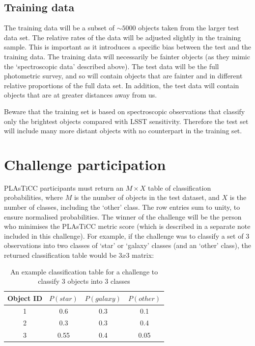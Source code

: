 \documentclass[\docopts]{\docclass}
\begin{document}
\subsection{Training data}
The training data will be a subset of $\sim 5000$ objects taken from the larger test data set. The relative rates of the data will be adjusted slightly in the training sample. This is important as it introduces a specific bias between the test and the training data. The training data will necessarily be fainter objects (as they mimic the `spectroscopic data' described above). The test data will be the full photometric survey, and so will contain objects that are fainter and in different relative proportions of the full data set. In addition, the test data will contain objects that are at greater distances away from us.

Beware that the training set is based on spectroscopic observations that classify only the brightest objects compared with LSST sensitivity. Therefore the test set will include many more distant objects with no counterpart in the training set.




\section{Challenge participation}
\label{sec:conclusion}
PLAsTiCC participants must return an $M\times X$ table of classification probabilities, where $M$ is the number of objects in the test dataset, and $X$ is the number of classes, including the `other' class. The row entries sum to unity, to ensure normalised probabilities. The winner of the challenge will be the person who minimises the PLAsTiCC metric score (which is described in a separate note included in this challenge). 
For example, if the challenge was to classify a set of 3 observations into two classes of `star' or `galaxy' classes (and an `other' class), the returned classification table would be $3x3$ matrix:

\begin{table}[htbp!]
\begin{center}
\begin{tabular}{|c|c|c|c|}
Object ID & $P(star)$ & $P(galaxy)$ & $P(other)$ \\
\hline
1 & 0.6 & 0.3 & 0.1\\
2 & 0.3 & 0.3 & 0.4\\
3 & 0.55 & 0.4 & 0.05\\
\end{tabular}
\caption{An example classification table for a challenge to classify 3 objects into 3 classes}
\end{center}
\end{table}
\end{document}
